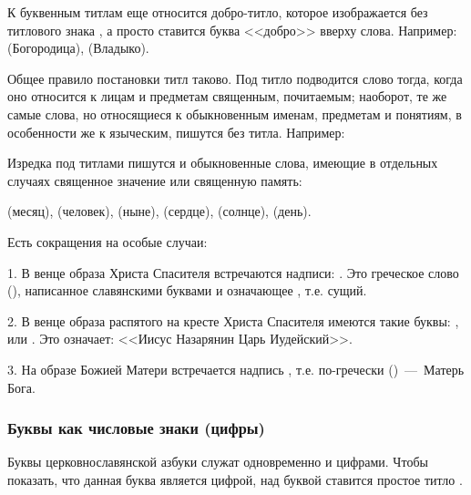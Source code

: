 \documentclass[11pt,a4paper,oneside]{memoir}
\begin{document}
    К буквенным титлам еще относится добро-титло, которое изображается без титлового знака {}, а просто ставится буква <<добро>> вверху слова. Например: {} (Богородица), {} (Владыко).
    
    Общее правило постановки титл таково. Под титло подводится слово тогда, когда оно относится к лицам и предметам священным, почитаемым; наоборот, те же самые слова, но относящиеся к обыкновенным именам, предметам и понятиям, в особенности же к языческим, пишутся без титла. Например:

    \bigskip{}

    Изредка под титлами пишутся и обыкновенные слова, имеющие в отдельных случаях священное значение или священную память:
    
    {} (месяц), {} (человек), {} (ныне), {} (сердце), {} (солнце), {} (день).
    
    Есть сокращения на особые случаи:
    
    1. В венце образа Христа Спасителя встречаются надписи: {}. Это греческое слово (), написанное славянскими буквами и означающее {}, т.е. сущий.
    
    2. В венце образа распятого на кресте Христа Спасителя имеются такие буквы: {}, или {}. Это означает: <<Иисус Назарянин Царь Иудейский>>.
    
    3. На образе Божией Матери встречается надпись {}, т.е. по-гречески ()~---~Матерь Бога.
        
                \subsubsection{Буквы как числовые знаки (цифры)}

    Буквы церковнославянской азбуки служат одновременно и цифрами. Чтобы показать, что данная буква является цифрой, над буквой ставится простое титло {}.
\end{document}
